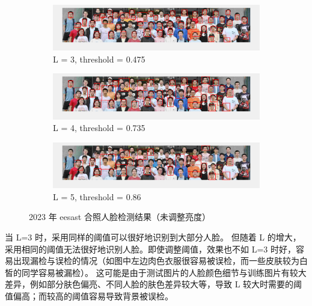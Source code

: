 \documentclass[a4paper]{article}  %
\begin{document}
\begin{figure}[ht]
    \centering
    \begin{subfigure}[b]{1.0\textwidth}
        \centering
        \includegraphics[width=\textwidth]{asserts/4_2_eesast_L3.png}
        \caption{
            L = 3, threshold = 0.475
        }\label{fig:4_2_eesast_L3}
    \end{subfigure}
    \vfill
    \begin{subfigure}[b]{1.0\textwidth}
        \centering
        \includegraphics[width=\textwidth]{asserts/4_2_eesast_L4.png}
        \caption{
            L = 4, threshold = 0.735
        }\label{fig:4_2_eesast_L4}
    \end{subfigure}
    \vfill
    \begin{subfigure}[b]{1.0\textwidth}
        \centering
        \includegraphics[width=\textwidth]{asserts/4_2_eesast_L5.png}
        \caption{
            L = 5, threshold = 0.86
        }\label{fig:4_2_eesast_L5}
    \end{subfigure}
    \caption{
        2023 年 eesast 合照人脸检测结果（未调整亮度）
    }\label{fig:4_2_eesast}
\end{figure}

当 L=3 时，采用同样的阈值可以很好地识别到大部分人脸。
但随着 L 的增大，采用相同的阈值无法很好地识别人脸。即使调整阈值，效果也不如 L=3 时好，容易出现漏检与误检的情况（如图中左边肉色衣服很容易被误检，而一些皮肤较为白皙的同学容易被漏检）。
这可能是由于测试图片的人脸颜色细节与训练图片有较大差异，例如部分肤色偏亮、不同人脸的肤色差异较大等，导致 L 较大时需要的阈值偏高；而较高的阈值容易导致背景被误检。
\end{document}
